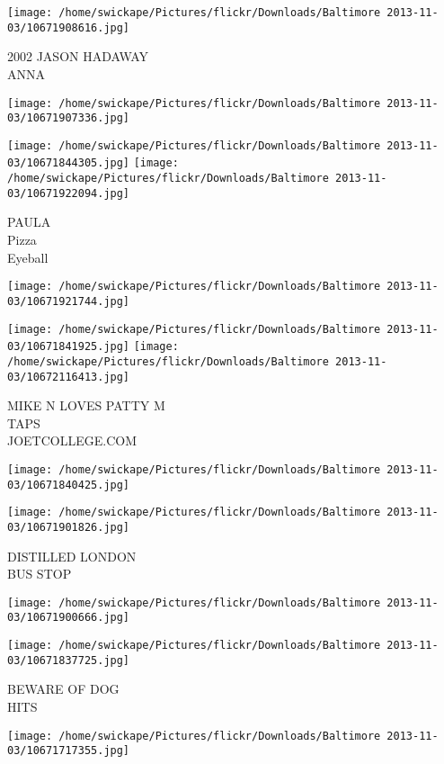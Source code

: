 \documentclass[10pt,letterpaper]{article}
\begin{document}
\vspace{0.25in}
\texttt{[image: /home/swickape/Pictures/flickr/Downloads/Baltimore 2013-11-03/10671908616.jpg]}

2002 JASON HADAWAY\\
ANNA
\pagebreak

\texttt{[image: /home/swickape/Pictures/flickr/Downloads/Baltimore 2013-11-03/10671907336.jpg]}

\vspace{0.25in}
\texttt{[image: /home/swickape/Pictures/flickr/Downloads/Baltimore 2013-11-03/10671844305.jpg]}
\texttt{[image: /home/swickape/Pictures/flickr/Downloads/Baltimore 2013-11-03/10671922094.jpg]}

PAULA\\
Pizza\\
Eyeball
\pagebreak

\texttt{[image: /home/swickape/Pictures/flickr/Downloads/Baltimore 2013-11-03/10671921744.jpg]}

\vspace{0.25in}
\texttt{[image: /home/swickape/Pictures/flickr/Downloads/Baltimore 2013-11-03/10671841925.jpg]}
\texttt{[image: /home/swickape/Pictures/flickr/Downloads/Baltimore 2013-11-03/10672116413.jpg]}

MIKE N LOVES PATTY M\\
TAPS\\
JOETCOLLEGE.COM
\pagebreak

\texttt{[image: /home/swickape/Pictures/flickr/Downloads/Baltimore 2013-11-03/10671840425.jpg]}

\vspace{0.25in}
\texttt{[image: /home/swickape/Pictures/flickr/Downloads/Baltimore 2013-11-03/10671901826.jpg]}

DISTILLED LONDON\\
BUS STOP
\pagebreak

\texttt{[image: /home/swickape/Pictures/flickr/Downloads/Baltimore 2013-11-03/10671900666.jpg]}

\vspace{0.25in}
\texttt{[image: /home/swickape/Pictures/flickr/Downloads/Baltimore 2013-11-03/10671837725.jpg]}

BEWARE OF DOG\\
HITS
\pagebreak

\texttt{[image: /home/swickape/Pictures/flickr/Downloads/Baltimore 2013-11-03/10671717355.jpg]}
\end{document}
